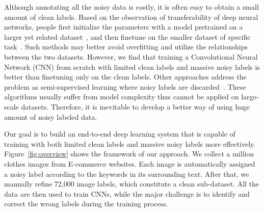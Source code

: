 \documentclass[10pt,twocolumn,letterpaper]{article}
\begin{document}
Although annotating all the noisy data is costly, it is often easy to obtain a small amount of clean labels. Based on the observation of transferability of deep neural networks, people first initialize the parameters with a model pretrained on a larger yet related dataset~\cite{krizhevsky2012imagenet}, and then finetune on the smaller dataset of specific task~\cite{oquab2013learning,azizpour2014generic,donahue2013decaf}. Such methods may better avoid overfitting and utilize the relationships between the two datasets. However, we find that training a Convolutional Neural Network (CNN) from scratch with limited clean labels and massive noisy labels is better than finetuning only on the clean labels. Other approaches address the problem as semi-supervised learning where noisy labels are discarded~\cite{zhu2002learning}. These algorithms usually suffer from model complexity thus cannot be applied on large-scale datasets. Therefore, it is inevitable to develop a better way of using huge amount of noisy labeled data.

Our goal is to build an end-to-end deep learning system that is capable of training with both limited clean labels and massive noisy labels more effectively. Figure~\ref{fig:overview} shows the framework of our approach. We collect a million clothes images from E-commerce websites. Each image is automatically assigned a noisy label according to the keywords in its surrounding text. After that, we manually refine 72,000 image labels, which constitute a clean sub-dataset. All the data are then used to train CNNs, while the major challenge is to identify and correct the wrong labels during the training process.
\end{document}
